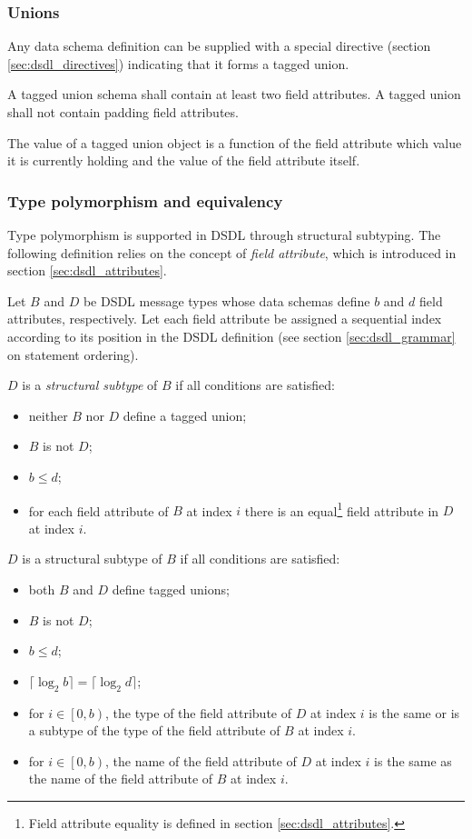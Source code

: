 \subsubsection{Unions}\label{sec:dsdl_composite_tagged_unions}

Any data schema definition can be supplied with a special directive (section \ref{sec:dsdl_directives})
indicating that it forms a tagged union.

A tagged union schema shall contain at least two field attributes.
A tagged union shall not contain padding field attributes.

The value of a tagged union object is a function of the field attribute which value it is currently holding
and the value of the field attribute itself.

\subsubsection{Type polymorphism and equivalency}

Type polymorphism is supported in DSDL through structural subtyping.
The following definition relies on the concept of \emph{field attribute},
which is introduced in section \ref{sec:dsdl_attributes}.

Let $B$ and $D$ be DSDL message types whose data schemas define $b$ and $d$ field attributes, respectively.
Let each field attribute be assigned a sequential index according to its position in the DSDL definition
(see section \ref{sec:dsdl_grammar} on statement ordering).

$D$ is a \emph{structural subtype} of $B$ if all conditions are satisfied:
\begin{itemize}
    \item neither $B$ nor $D$ define a tagged union;
    \item $B$ is not $D$;
    \item $b \leq d$;
    \item for each field attribute of $B$ at index $i$ there is an equal\footnote{%
              Field attribute equality is defined in section \ref{sec:dsdl_attributes}.
          } field attribute in $D$ at index $i$.
\end{itemize}

$D$ is a structural subtype of $B$ if all conditions are satisfied:
\begin{itemize}
    \item both $B$ and $D$ define tagged unions;
    \item $B$ is not $D$;
    \item $b \leq d$;
    \item $\lceil{}\log_2 b\rceil{} = \lceil{}\log_2 d\rceil{}$;
    \item for $i \in \left[0, b\right)$, the type of the field attribute of $D$ at index $i$
          is the same or is a subtype of the type of the field attribute of $B$ at index $i$.
    \item for $i \in \left[0, b\right)$, the name of the field attribute of $D$ at index $i$
          is the same as the name of the field attribute of $B$ at index $i$.
\end{itemize}

